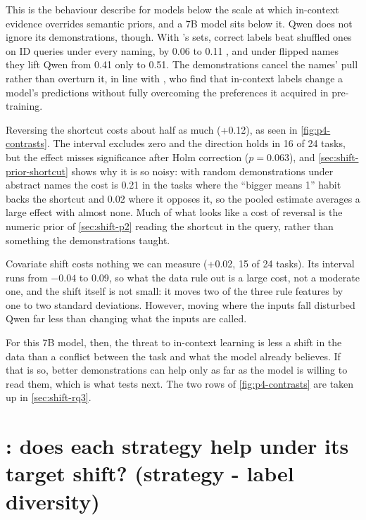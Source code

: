 This is the behaviour \citet{wei2023larger} describe for models below the scale at which in-context evidence overrides semantic priors, and a 7B model sits below it. Qwen does not ignore its demonstrations, though. With 's sets, correct labels beat shuffled ones on ID queries under every naming, by 0.06 to 0.11 \AUROC, and under flipped names they lift Qwen from 0.41 only to 0.51. The demonstrations cancel the names' pull rather than overturn it, in line with \citet{kossen2024incontext}, who find that in-context labels change a model's predictions without fully overcoming the preferences it acquired in pre-training.

Reversing the shortcut costs about half as much (+0.12), as seen in \autoref{fig:p4-contrasts}. The interval excludes zero and the direction holds in 16 of 24 tasks, but the effect misses significance after Holm correction ($p = 0.063$), and \autoref{sec:shift-prior-shortcut} shows why it is so noisy: with random demonstrations under abstract names the cost is 0.21 in the tasks where the ``bigger means 1'' habit backs the shortcut and 0.02 where it opposes it, so the pooled estimate averages a large effect with almost none. Much of what looks like a cost of reversal is the numeric prior of \autoref{sec:shift-p2} reading the shortcut in the query, rather than something the demonstrations taught.

Covariate shift costs nothing we can measure (+0.02, 15 of 24 tasks). Its interval runs from $-0.04$ to 0.09, so what the data rule out is a large cost, not a moderate one, and the shift itself is not small: it moves two of the three rule features by one to two standard deviations. However, moving where the inputs fall disturbed Qwen far less than changing what the inputs are called.

For this 7B model, then, the threat to in-context learning is less a shift in the data than a conflict between the task and what the model already believes. If that is so, better demonstrations can help only as far as the model is willing to read them, which is what  tests next. The two  rows of \autoref{fig:p4-contrasts} are taken up in \autoref{sec:shift-rq3}.

\section{: does each strategy help under its target shift? (strategy - label diversity)}
\label{sec:shift-rq2}


